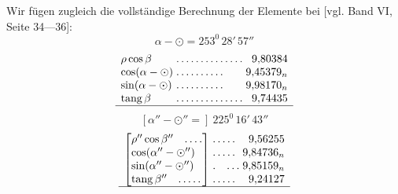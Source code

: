 Wir fügen zugleich die vollständige Berechnung der Elemente bei [vgl. Band VI, Seite 34—36]:
\[
\alpha-\odot=253^{0}\,28'\,57''
\]
\[
\begin{array}{l@{\;}l@{\;}r}
\rho\cos\beta&\mathord{.}\,\mathord{.}\,\mathord{.}\,\mathord{.}\,\mathord{.}\,\mathord{.}\,\mathord{.}\,\mathord{.}\,\mathord{.}\,\mathord{.}\,\mathord{.}\,\mathord{.}\,\mathord{.}\,\mathord{.}&9{,}80384\\
\cos(\alpha-\odot)&\mathord{.}\,\mathord{.}\,\mathord{.}\,\mathord{.}\,\mathord{.}\,\mathord{.}\,\mathord{.}\,\mathord{.}\,\mathord{.}\,\mathord{.}&9{,}45379_n\\
\sin(\alpha-\odot)&\mathord{.}\,\mathord{.}\,\mathord{.}\,\mathord{.}\,\mathord{.}\,\mathord{.}\,\mathord{.}\,\mathord{.}\,\mathord{.}\,\mathord{.}&9{,}98170_n\\
\operatorname{tang}\beta&\mathord{.}\,\mathord{.}\,\mathord{.}\,\mathord{.}\,\mathord{.}\,\mathord{.}\,\mathord{.}\,\mathord{.}\,\mathord{.}\,\mathord{.}\,\mathord{.}\,\mathord{.}\,\mathord{.}\,\mathord{.}&9{,}74435\\\hline
\end{array}
\]
\[
[\alpha''-\odot''=]\ 225^{0}\,16'\,43''
\]
\[
\begin{array}{l@{\;}l@{\;}r}
\left[\begin{array}{@{}l@{}}\rho''\cos\beta''\quad\mathord{.}\,\mathord{.}\,\mathord{.}\,\mathord{.}\\\cos(\alpha''-\odot'')\\\sin(\alpha''-\odot'')\\\operatorname{tang}\beta''\quad\mathord{.}\,\mathord{.}\,\mathord{.}\,\mathord{.}\,\mathord{.}\end{array}\right]&
\begin{array}{@{}l@{}}\mathord{.}\,\mathord{.}\,\mathord{.}\,\mathord{.}\,\mathord{.}\\\mathord{.}\,\mathord{.}\,\mathord{.}\,\mathord{.}\,\mathord{.}\\\mathord{.}\quad\mathord{.}\,\mathord{.}\,\mathord{.}\\\mathord{.}\,\mathord{.}\,\mathord{.}\,\mathord{.}\,\mathord{.}\end{array}&
\begin{array}{@{}r@{}}9{,}56255\\9{,}84736_n\\9{,}85159_n\\9{,}24127\end{array}\\\hline
\end{array}
\]
